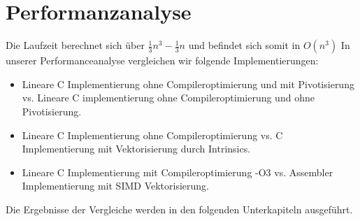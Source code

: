 \documentclass[course=erap]{aspdoc}
\begin{document}
\section{Performanzanalyse}
\label{Performanzanalyse}
Die Laufzeit berechnet sich über  $ \frac{1}{3}n^3 -\frac{1}{3} n $ und befindet sich somit in $O(n^3)$ \cite{LULaufzeit}
In unserer Performanceanalyse vergleichen wir folgende Implementierungen:\\
\begin{itemize}
\item Lineare C Implementierung ohne Compileroptimierung und mit Pivotisierung vs. Lineare C implementierung ohne Compileroptimierung und ohne Pivotisierung. 
\item Lineare C Implementierung ohne Compileroptimierung vs. C Implementierung mit Vektorisierung durch Intrinsics. 
\item Lineare C Implementierung mit Compileroptimierung -O3 vs. Assembler Implementierung mit SIMD Vektorisierung.
\end{itemize}
Die Ergebnisse der Vergleiche werden in den folgenden Unterkapiteln ausgeführt. \\
\end{document}
